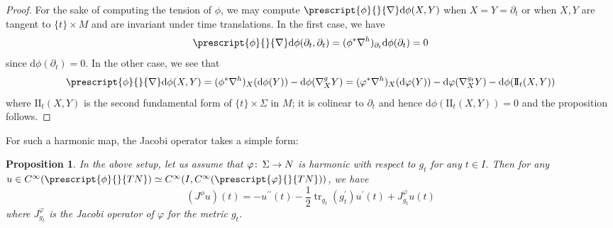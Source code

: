 \documentclass{article}
\numberwithin{equation}{section}        %
\theoremstyle{bfnote}
\newtheorem{prop}[thm]{Proposition}         %
\theoremstyle{definition}
\theoremstyle{bfremark}
\newcommand{\col}{\colon \thinspace}        %
\newcommand{\II}{\mathrm{I\!I}}             %
\newcommand{\diff}{\mathrm{d}}                      %
\DeclareMathOperator{\tr}{tr}                   %
\begin{document}
\begin{proof}
    For the sake of computing the tension of $\phi$, we may compute $\prescript{\phi}{}{\nabla} \diff \phi(X,Y)$ when $X = Y = \partial_t$ or when $X, Y$ are tangent to $\{ t \} \times M$ and are invariant under time translations. In the first case, we have 
	\begin{equation}
		\prescript{\phi}{}{\nabla} \diff \phi(\partial_t,\partial_t) = (\phi^* \nabla^h)_{\partial_t} \diff \phi(\partial_t) = 0
	\end{equation}
	since $\diff \phi(\partial_t) = 0$. In the other case, we see that
    \begin{equation*}
        \prescript{\phi}{}{\nabla} \diff \phi(X,Y) = (\phi^* \nabla^h)_X(\diff \phi(Y)) - \diff \phi(\nabla^{g}_X Y) = (\varphi^* \nabla^h)_X(\diff\varphi(Y)) - \diff\varphi(\nabla^{g_t}_X Y) - \diff \phi(\II_t(X,Y))
    \end{equation*}
    where $\II_t(X,Y)$ is the second fundamental form of $\{t\} \times \Sigma$ in $M$; it is colinear to $\partial_t$ and hence $\diff \phi(\II_t(X,Y)) = 0$ and the proposition follows.
\end{proof}

For such a harmonic map, the Jacobi operator takes a simple form:

\begin{prop}    \label{prop: Jacobi for warped product and constant map}
    In the above setup, let us assume that $\varphi \col \Sigma \rightarrow N$ is harmonic with respect to $g_t$ for any $t \in I$. Then for any $u \in C^\infty(\prescript{\phi}{}{TN}) \simeq C^\infty(I, C^{\infty}(\prescript{\varphi}{}{TN}))$, we have
    \begin{equation*}
        (J^\phi u)(t) = - u^{\prime\prime}(t) - \frac{1}{2} \tr_{g_t}(g^\prime_t) u^\prime(t) + J^\varphi_{g_t} u(t)
    \end{equation*}
    where $J^\varphi_{g_t}$ is the Jacobi operator of $\varphi$ for the metric $g_t$.
\end{prop}
\end{document}
